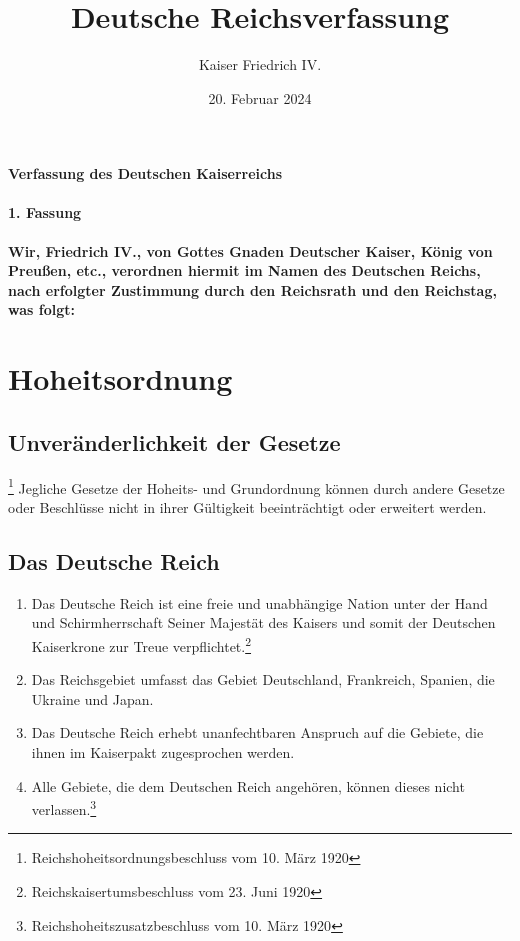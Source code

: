 \documentclass{article}
\title{Deutsche Reichsverfassung}
\author{Kaiser Friedrich IV.}
\date{20. Februar 2024}
\newenvironment*{pg}{\begin{enumerate}[(1)]}{\end{enumerate}}
\begin{document}
\maketitle
\vspace*{\fill}
\paragraph{Verfassung des Deutschen Kaiserreichs}

\newpage
{}
\vspace*{\fill}
\begin{Center}
\textbf{1. Fassung}
\vspace*{\fill}
\end{Center}
\newpage
{}
\vspace*{\fill}
\paragraph*{Wir, Friedrich IV., von Gottes Gnaden Deutscher Kaiser, König von Preußen, etc., verordnen
hiermit im Namen des Deutschen Reichs, nach erfolgter Zustimmung durch den Reichsrath und den Reichstag,
was folgt:}
\vspace*{\fill}
\newpage
\tableofcontents
\newpage
\section{Hoheitsordnung}
\subsection{Unveränderlichkeit der Gesetze}\footnote{Reichshoheitsordnungsbeschluss vom 10. März 1920}
Jegliche Gesetze der Hoheits- und Grundordnung können durch andere Gesetze oder Beschlüsse nicht in ihrer Gültigkeit beeinträchtigt oder erweitert werden.

\subsection{Das Deutsche Reich}
\begin{pg}
    \item Das Deutsche Reich ist eine freie und unabhängige Nation unter der Hand und Schirmherrschaft Seiner Majestät des Kaisers und somit der Deutschen Kaiserkrone zur Treue verpflichtet.\footnote{Reichskaisertumsbeschluss vom 23. Juni 1920}
    \item Das Reichsgebiet umfasst das Gebiet Deutschland, Frankreich, Spanien, die Ukraine und Japan.
    \item Das Deutsche Reich erhebt unanfechtbaren Anspruch auf die Gebiete, die ihnen im Kaiserpakt zugesprochen werden.
    \item Alle Gebiete, die dem Deutschen Reich angehören, können dieses nicht verlassen.\footnote{Reichshoheitszusatzbeschluss vom 10. März 1920}
\end{pg}
\end{document}
